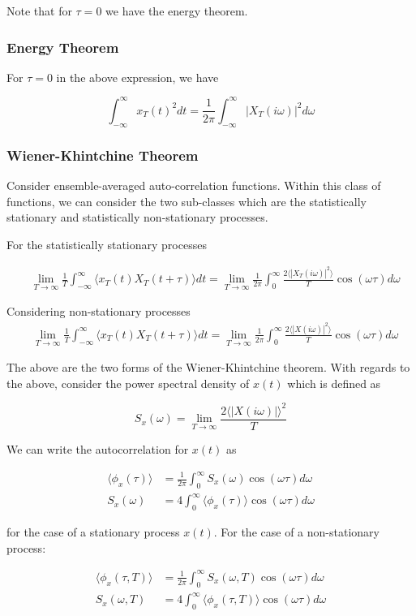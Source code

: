 \documentclass{article}
\begin{document}
Note that for  $ \tau = 0 $ we have the energy theorem.

\subsubsection{Energy Theorem}

For  $ \tau = 0 $ in the above expression, we have

\[
   \int_{-\infty}^{\infty} x_T(t)^2 dt = \frac{1}{2\pi}
   \int_{-\infty}^{\infty}|X_T(i\omega)|^{2}d\omega
\]

\subsubsection{Wiener-Khintchine Theorem}

Consider ensemble-averaged auto-correlation functions. Within this class of
functions, we can consider the two sub-classes which are the statistically
stationary and statistically non-stationary processes.

For the statistically stationary processes

\begin{align}
   & \lim_{T \rightarrow \infty} \frac{1}{T} \int_{-\infty}^{\infty} \langle
      x_T(t)X_T(t+\tau) \rangle dt
       = \lim_{T \rightarrow \infty} \frac{1}{2\pi} \int_{0}^{\infty} \frac{2
      \langle |X_{T}(i\omega)|^2 \rangle}{T} \cos(\omega\tau)d\omega
\end{align}


Considering non-stationary processes
\begin{align}
   & \lim_{T \rightarrow \infty} \frac{1}{T} \int_{-\infty}^{\infty} \langle
      x_T(t)X_T(t+\tau) \rangle dt
       = \lim_{T \rightarrow \infty} \frac{1}{2\pi} \int_{0}^{\infty} \frac{2
      \langle |X(i\omega)|^2 \rangle}{T} \cos(\omega\tau)d\omega
\end{align}

The above are the two forms of the Wiener-Khintchine theorem. With regards to
the above, consider the power spectral density of  $ x(t) $ which is defined as

\[
   S_{x}(\omega) = \lim_{T \rightarrow \infty} \frac{2 \langle |X(i \omega)|
   \rangle ^2}{T}
\]

We can write the autocorrelation for  $ x(t)$ as

\begin{align}
   \langle \phi_x(\tau) \rangle &= \frac{1}{2\pi} \int_{0}^{\infty}
   S_{x}(\omega) \cos(\omega \tau) d \omega \\
   S_{x}(\omega) &= 4 \int_{0}^{\infty}\langle \phi_{x}(\tau) \rangle \cos(\omega
   \tau) d\omega
\end{align}

for the case of a stationary process  $ x(t) $. For the case of a non-stationary
process:

\begin{align}
   \langle \phi_x(\tau,T) \rangle &= \frac{1}{2\pi} \int_{0}^{\infty}
   S_{x}(\omega,T) \cos(\omega \tau) d \omega \\
   S_{x}(\omega,T) &= 4 \int_{0}^{\infty}\langle \phi_{x}(\tau,T) \rangle \cos(\omega
   \tau) d\omega
\end{align}
\end{document}
